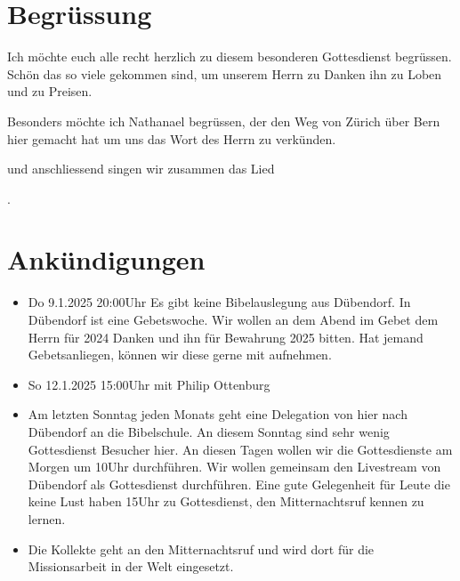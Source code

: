 
\section{Begrüssung}

Ich möchte euch alle recht herzlich zu diesem besonderen Gottesdienst begrüssen. Schön das so viele gekommen sind, um unserem Herrn zu Danken ihn zu Loben und zu Preisen.

Besonders möchte ich Nathanael begrüssen, der den Weg von Zürich über Bern hier gemacht hat um uns das Wort des Herrn zu verkünden. 

\noindent
\beten{} und anschliessend singen wir zusammen das Lied

\noindent
{}.

\section{Ankündigungen}
\begin{itemize}
    \item {} Do 9.1.2025 20:00Uhr Es gibt keine Bibelauslegung aus Dübendorf. In Dübendorf ist eine Gebetswoche. Wir wollen an dem Abend im Gebet dem Herrn für 2024 Danken und ihn für Bewahrung 2025 bitten. Hat jemand Gebetsanliegen, können wir diese gerne mit aufnehmen.
    \item {} So 12.1.2025 15:00Uhr mit Philip Ottenburg
    \item {} Am letzten Sonntag jeden Monats geht eine Delegation von hier nach Dübendorf an die Bibelschule. An diesem Sonntag sind sehr wenig Gottesdienst Besucher hier. An diesen Tagen wollen wir die Gottesdienste am Morgen um 10Uhr durchführen. Wir wollen gemeinsam den Livestream von Dübendorf als Gottesdienst durchführen. Eine gute Gelegenheit für Leute die keine Lust haben 15Uhr zu Gottesdienst, den Mitternachtsruf kennen zu lernen.
    \item {} Die Kollekte geht an den Mitternachtsruf und wird dort für die Missionsarbeit in der Welt eingesetzt.
\end{itemize}

